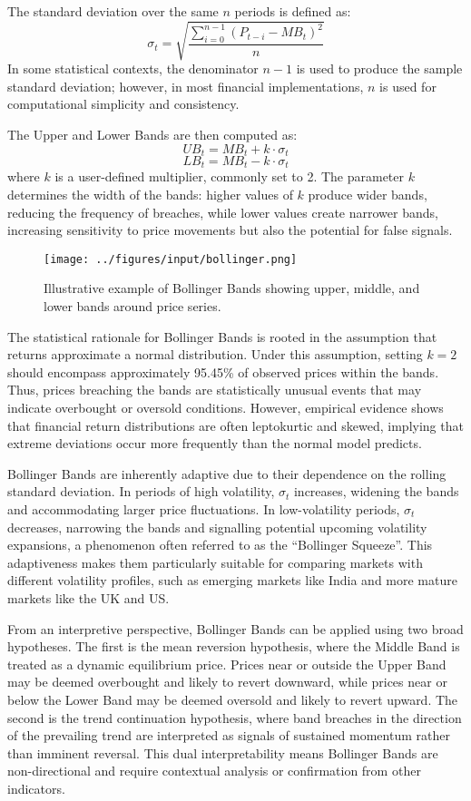 The standard deviation over the same $n$ periods is defined as:
\[
\sigma_t = \sqrt{\frac{\sum_{i=0}^{n-1} \left(P_{t-i} - MB_t \right)^2}{n}}
\]
In some statistical contexts, the denominator $n-1$ is used to produce the sample standard deviation; however, in most financial implementations, $n$ is used for computational simplicity and consistency.

The Upper and Lower Bands are then computed as:
\[
UB_t = MB_t + k \cdot \sigma_t
\]
\[
LB_t = MB_t - k \cdot \sigma_t
\]
where $k$ is a user-defined multiplier, commonly set to 2. The parameter $k$ determines the width of the bands: higher values of $k$ produce wider bands, reducing the frequency of breaches, while lower values create narrower bands, increasing sensitivity to price movements but also the potential for false signals.

\begin{figure}[H]
    \centering
    \texttt{[image: ../figures/input/bollinger.png]}
    \caption{Illustrative example of Bollinger Bands showing upper, middle, and lower bands around price series.}
\end{figure}

The statistical rationale for Bollinger Bands is rooted in the assumption that returns approximate a normal distribution. Under this assumption, setting $k = 2$ should encompass approximately 95.45\% of observed prices within the bands. Thus, prices breaching the bands are statistically unusual events that may indicate overbought or oversold conditions. However, empirical evidence shows that financial return distributions are often leptokurtic and skewed, implying that extreme deviations occur more frequently than the normal model predicts.

Bollinger Bands are inherently adaptive due to their dependence on the rolling standard deviation. In periods of high volatility, $\sigma_t$ increases, widening the bands and accommodating larger price fluctuations. In low-volatility periods, $\sigma_t$ decreases, narrowing the bands and signalling potential upcoming volatility expansions, a phenomenon often referred to as the ``Bollinger Squeeze''. This adaptiveness makes them particularly suitable for comparing markets with different volatility profiles, such as emerging markets like India and more mature markets like the UK and US.

From an interpretive perspective, Bollinger Bands can be applied using two broad hypotheses. The first is the mean reversion hypothesis, where the Middle Band is treated as a dynamic equilibrium price. Prices near or outside the Upper Band may be deemed overbought and likely to revert downward, while prices near or below the Lower Band may be deemed oversold and likely to revert upward. The second is the trend continuation hypothesis, where band breaches in the direction of the prevailing trend are interpreted as signals of sustained momentum rather than imminent reversal. This dual interpretability means Bollinger Bands are non-directional and require contextual analysis or confirmation from other indicators.

